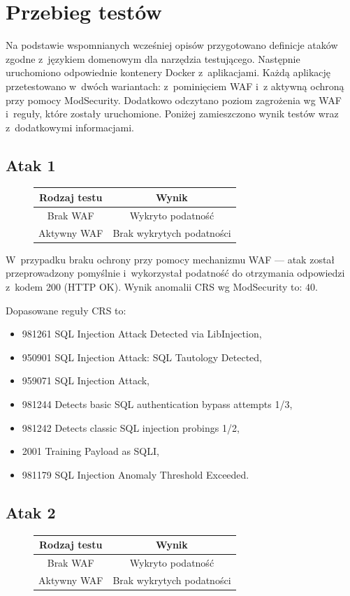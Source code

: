 \documentclass[12pt,a4paper,polish,thesis]{dcsbook}
\begin{document}
\section{Przebieg testów}
Na podstawie wspomnianych wcześniej opisów przygotowano definicje ataków zgodne z~językiem domenowym dla narzędzia testującego. Następnie uruchomiono odpowiednie kontenery Docker z~aplikacjami. Każdą aplikację przetestowano w~dwóch wariantach: z~pominięciem WAF i~z aktywną ochroną przy pomocy ModSecurity. Dodatkowo odczytano poziom zagrożenia wg WAF i~reguły, które zostały uruchomione. Poniżej zamieszczono wynik testów wraz z~dodatkowymi informacjami.
\FloatBarrier
\subsection*{Atak 1}

\begin{figure}[!htbp]
\centering
\begin{tabular}{|c|c|}
\hline 
\textbf{Rodzaj testu} & \textbf{Wynik} \\ 
\hline 
Brak WAF & Wykryto podatność \\ 
\hline 
Aktywny WAF & Brak wykrytych podatności \\ 
\hline 
\end{tabular} 

\end{figure}
\FloatBarrier

 W~przypadku braku ochrony przy pomocy mechanizmu WAF --- atak został przeprowadzony pomyślnie i~wykorzystał podatność do otrzymania odpowiedzi z~kodem 200 (HTTP OK). Wynik anomalii CRS wg ModSecurity to: $40$.

Dopasowane reguły CRS to:
\begin{itemize}
\item 981261 SQL Injection Attack Detected via LibInjection,
\item 950901 SQL Injection Attack: SQL Tautology Detected,
\item 959071 SQL Injection Attack,
\item 981244 Detects basic SQL authentication bypass attempts 1/3,
\item 981242 Detects classic SQL injection probings 1/2,
\item 2001 Training Payload as SQLI,
\item 981179 SQL Injection Anomaly Threshold Exceeded.
\end{itemize}

\subsection*{Atak 2}
\FloatBarrier
\begin{figure}[!htbp]
\centering
\begin{tabular}{|c|c|}
\hline 
\textbf{Rodzaj testu} & \textbf{Wynik} \\ 
\hline 
Brak WAF & Wykryto podatność \\ 
\hline 
Aktywny WAF & Brak wykrytych podatności \\ 
\hline 
\end{tabular} 
\end{figure}
\end{document}
